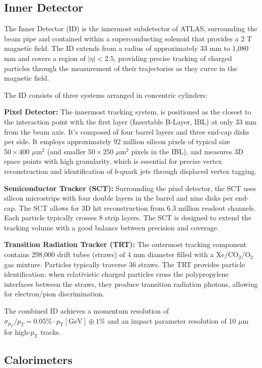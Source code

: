 \subsection{Inner Detector}

The Inner Detector (ID) is the innermost subdetector of ATLAS, surrounding the beam pipe and contained within a superconducting solenoid that provides a 2 T magnetic field. The ID extends from a radius of approximately 33 mm to 1,080 mm and covers a region of $|\eta| < 2.5$, providing precise tracking of charged particles through the measurement of their trajectories as they curve in the magnetic field.

The ID consists of three systems arranged in concentric cylinders:

\textbf{Pixel Detector:} The innermost tracking system, is positioned as the closest to the interaction point with the first layer (Insertable B-Layer, IBL) at only 33 mm from the beam axis. It's composed of four barrel layers and three end-cap disks per side. It employs approximately 92 million silicon pixels of typical size $50 \times 400$ $\mu$m$^{2}$ (and smaller $50 \times 250$ $\mu$m$^{2}$ pixels in the IBL), and measures 3D space points with high granularity, which is essential for precise vertex reconstruction and identification of $b$-quark jets through displaced vertex tagging.

\textbf{Semiconductor Tracker (SCT):} Surrounding the pixel detector, the SCT uses silicon microstrips with four double layers in the barrel and nine disks per end-cap. The SCT allows for 3D hit reconstruction from 6.3 million readout channels. Each particle typically crosses 8 strip layers. The SCT is designed to extend the tracking volume with a good balance between precision and coverage.

\textbf{Transition Radiation Tracker (TRT):} The outermost tracking component contains 298,000 drift tubes (straws) of 4 mm diameter filled with a Xe/CO$_2$/O$_2$ gas mixture. Particles typically traverse 36 straws. The TRT provides particle identification: when relativistic charged particles cross the polypropylene interfaces between the straws, they produce transition radiation photons, allowing for electron/pion discrimination.


The combined ID achieves a momentum resolution of $\sigma_{p_\text{T}}/p_T = 0.05\%\cdot p_\text{T}[\text{GeV}] \oplus 1\%$ and an impact parameter resolution of 10 $\mu$m for high-$p_\text{T}$ tracks.

\subsection{Calorimeters}

